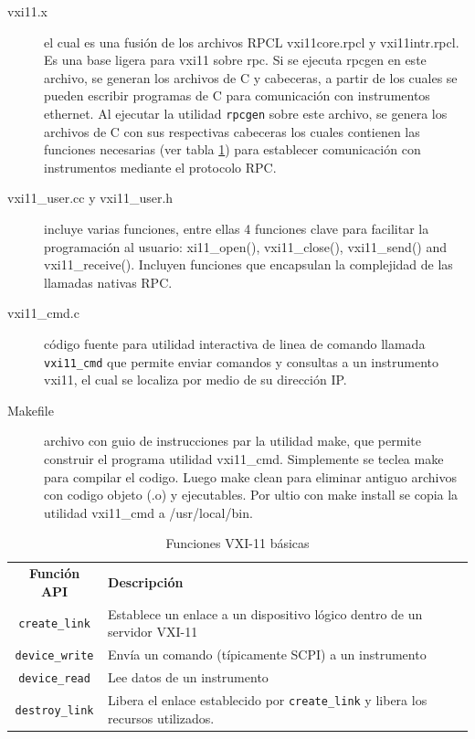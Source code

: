 \documentclass[paper=letter,oneside,fontsize=11pt, parskip=full]{scrartcl}
\begin{document}
		\begin{description}
			\item[\ttfamily vxi11.x] el cual es una fusión de los archivos RPCL vxi11core.rpcl y vxi11intr.rpcl. Es una base ligera para vxi11 sobre rpc. Si se ejecuta rpcgen en este archivo, se generan los archivos de C y cabeceras, a partir de los cuales se pueden escribir programas de C para comunicación con instrumentos ethernet. Al ejecutar la utilidad \texttt{rpcgen} sobre este archivo, se genera los archivos de C con sus respectivas cabeceras los cuales contienen las funciones necesarias (ver tabla \ref{Tab:FuncionesVXI11Basicas}) para establecer comunicación con instrumentos mediante el protocolo RPC.
			
			\item[\ttfamily vxi11\_user.cc y vxi11\_user.h]  incluye varias funciones, entre ellas 4 funciones clave para facilitar la programación al usuario: xi11\_open(), vxi11\_close(), vxi11\_send() and vxi11\_receive(). Incluyen funciones que encapsulan la complejidad de las llamadas nativas RPC.
			
			\item[\ttfamily vxi11\_cmd.c] código fuente para utilidad interactiva de linea de comando llamada \texttt{vxi11\_cmd} que permite enviar comandos y consultas a un instrumento vxi11, el cual se localiza por medio de su dirección IP.
			
			\item[\ttfamily Makefile] archivo con guio de instrucciones par la utilidad make, que permite construir el programa utilidad vxi11\_cmd. Simplemente se teclea make para compilar el codigo. Luego make clean para eliminar antiguo archivos con codigo objeto (.o) y ejecutables. Por ultio con make install se copia la utilidad vxi11\_cmd a /usr/local/bin.		
		\end{description}		
	
		\begin{table}
			\begin{tabular}{cl}
				\textbf{Función API} 	& \textbf{Descripción} \\
				\texttt{create\_link}	& Establece un enlace a un dispositivo lógico dentro de un servidor VXI-11 \\
				\texttt{device\_write}	& Envía un comando (típicamente SCPI) a un instrumento \\
				\texttt{device\_read}	& Lee datos de un instrumento \\
				\texttt{destroy\_link}	& Libera el enlace establecido por \texttt{create\_link} y libera los recursos utilizados.				
			\end{tabular}
			\caption{Funciones VXI-11 básicas}
			\label{Tab:FuncionesVXI11Basicas}
		\end{table}
	
\end{document}
